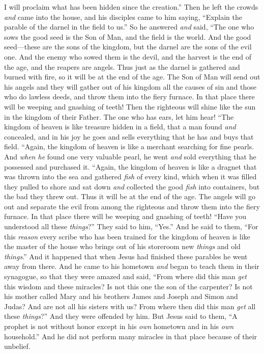 \begin{biblechapter}
I will proclaim what has been hidden since the creation.”
 Then he left the crowds \textit{and} came into the house, and his disciples came to him saying, “Explain the parable of the darnel in the field to us.”
\verse So he answered \textit{and} said, “The one who sows the good seed is the Son of Man,
\verse and the field is the world. And the good seed—these are the sons of the kingdom, but the darnel are the sons of the evil one.
\verse And the enemy who sowed them is the devil, and the harvest is the end of the age, and the reapers are angels.
\verse Thus just as the darnel is gathered and burned with fire, so it will be at the end of the age.
\verse The Son of Man will send out his angels and they will gather out of his kingdom all the causes of sin and those who do lawless deeds,
\verse and throw them into the fiery furnace. In that place there will be weeping and gnashing of teeth!
\verse Then the righteous will shine like the sun in the kingdom of their Father. The one who has ears, let him hear!
 “The kingdom of heaven is like treasure hidden in a field, that a man found \textit{and} concealed, and in his joy he goes and sells everything that he has and buys that field.
 “Again, the kingdom of heaven is like a merchant searching for fine pearls.
\verse And \textit{when he} found one very valuable pearl, he went \textit{and} sold everything that he possessed and purchased it.
 “Again, the kingdom of heaven is like a dragnet that was thrown into the sea and gathered \textit{fish} of every kind,
\verse which when it was filled they pulled to shore and sat down \textit{and} collected the good \textit{fish} into containers, but the bad they threw out.
\verse Thus it will be at the end of the age. The angels will go out and separate the evil from among the righteous
\verse and throw them into the fiery furnace. In that place there will be weeping and gnashing of teeth!
\verse “Have you understood all these \textit{things}?” They said to him, “Yes.”
\verse And he said to them, “For this \textit{reason} every scribe who has been trained for the kingdom of heaven is like the master of the house who brings out of his storeroom new \textit{things} and old \textit{things}.”
 And it happened that when Jesus had finished these parables he went away from there.
\verse And he came to his hometown \textit{and} began to teach them in their synagogue, so that they were amazed and said, “From where did this man \textit{get} this wisdom and these miracles?
\verse Is not this one the son of the carpenter? Is not his mother called Mary and his brothers James and Joseph and Simon and Judas?
\verse And are not all his sisters with us? From where then did this man \textit{get} all these \textit{things}?”
\verse And they were offended by him. But Jesus said to them, “A prophet is not without honor except in his \textit{own} hometown and in his \textit{own} household.”
\verse And he did not perform many miracles in that place because of their unbelief.
\end{biblechapter}

